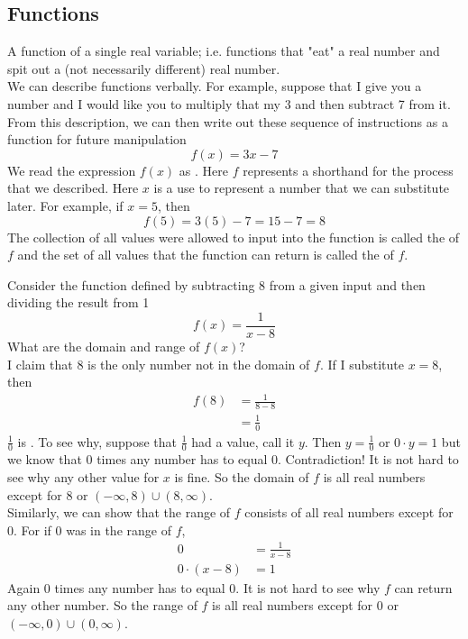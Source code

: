 \subsection{Functions}

A function of a single real variable; i.e. functions that "eat" a real number and spit out a (not necessarily different) real number. \\ 
We can describe functions verbally. For example, suppose that I give you a number and I would like you to multiply that my 3 and then subtract 7 from it. From this description, we can then write out these sequence of instructions as a function for future manipulation 
\[ f(x) = 3x -7 \]
We read the expression \( f(x) \) as . Here \( f \) represents a shorthand for the process that we described. Here \( x \) is a  use to represent a number that we can substitute later. For example, if \( x=5 \), then 
\[ f(5) = 3(5)-7=15-7=8 \]
The collection of all values were allowed to input into the function is called the  of \( f \) and the set of all values that the function can return is called the  of \( f \).\\ 
\begin{example}
    Consider the function defined by subtracting 8 from a given input and then dividing the result from 1
\[ f(x)= \frac{1}{x-8}\]
What are the domain and range of \( f(x) \)? \\ 
I claim that \( 8 \) is the only number not in the domain of \( f \). If I substitute \( x =8 \), then 
\begin{align*}
    f(8) &= \frac{1}{8-8}\\ 
    &= \frac{1}{0}
\end{align*}
\( \frac{1}{0} \) is . To see why, suppose that \( \frac{1}{0} \) had a value, call it \( y \). Then \( y= \frac{1}{0} \) or \( 0 \cdot y =1 \) but we know that \( 0 \) times any number has to equal \( 0 \). Contradiction! It is not hard to see why any other value for \( x \) is fine. So the domain of \( f \) is all real numbers except for \( 8 \) or \( \boxed{\left( - \infty, 8 \right) \cup \left( 8, \infty \right)} \). \\ 
Similarly, we can show that the range of \( f \) consists of all real numbers except for \( 0 \). For if \( 0 \) was in the range of \( f \), 
\begin{align*}
    0 &= \frac{1}{x-8}\\ 
    0 \cdot \left( x-8 \right) &=1
\end{align*}
Again \( 0 \) times any number has to equal \( 0 \). It is not hard to see why \( f \) can return any other number. So the range of \( f \) is all real numbers except for \( 0 \) or \( \boxed{\left( - \infty, 0 \right) \cup \left( 0, \infty \right)} \).
\end{example}


